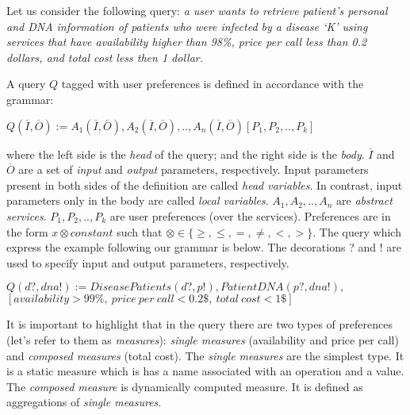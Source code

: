 Let us consider the following query: \textit{a user wants to retrieve patient's personal and DNA information of patients who were infected by a disease `K' using services that have availability higher than 98\%, price per call less than 0.2 dollars, and total cost less then 1 dollar.} 

A query $Q$ tagged with user preferences is defined in accordance with the grammar:
\begin{center}
$Q (\overline{I}, \overline{O}) := A_{1}(\overline{I}, \overline{O}), A_{2}(\overline{I}, \overline{O}), ..,  A_{n}(\overline{I}, \overline{O})[P_{1},P_{2}, .., P_{k}]$
\end{center}
where the left side is the \textit{head} of the query; and the right side is the \textit{body}. 
$\overline{I}$ and $\overline{O}$ are a set of \textit{input} and \textit{output} parameters, respectively.
Input parameters present in both sides of the definition are called \textit{head variables}.
In contrast, input parameters only in the body are called \textit{local variables}.
$A_{1}, A_{2}, .., A_{n}$ are \textit{abstract services}.
$P_{1}, P_{2}, .., P_{k}$ are user preferences (over the services). Preferences are in the form $x \otimes constant$ such that $\otimes \in\lbrace \geq, \leq, =, \neq, <, >\rbrace$.
The query which express the example following our grammar is below.
The decorations ? and ! are used to specify input and output parameters, respectively. 
\begin{small}
\begin{center}
$Q (d?, dna!) := DiseasePatients(d?, p!), PatientDNA(p?, dna!),$ \\
$[availability > 99\%, \ price \ per \ call < 0.2\$, \ total \ cost < 1\$]$
\end{center} 
\end{small}

It is important to highlight that in the query there are two types of preferences (let's refer to them as \textit{measures}): \textit{single measures} (availability and price per call) and \textit{composed measures} (total cost). 
The \textit{single measures} are the simplest type. It is a static measure which is has a name associated with an operation and a value. The\textit{ composed measure} is dynamically computed measure. It is defined as aggregations of \textit{single measures}. 

